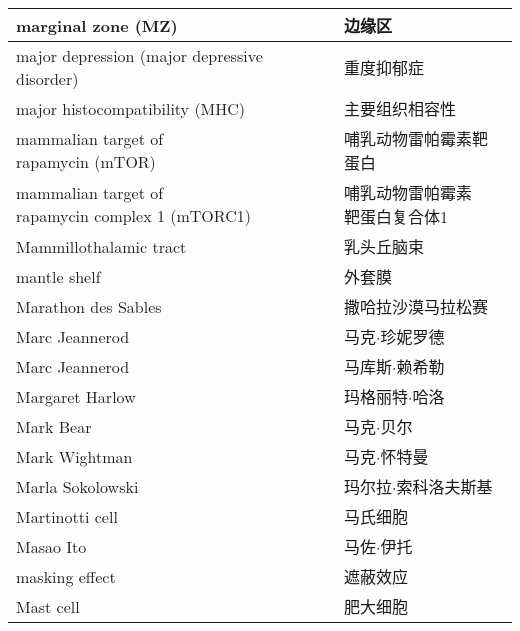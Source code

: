 \begin{longtable}{lll}
	\midrule
	marginal zone (MZ)   && 边缘区  \\
	
	\midrule
	major depression (major depressive disorder)   && 重度抑郁症  \\
	
	\midrule
	major histocompatibility (MHC)   && 主要组织相容性  \\
	
	\midrule
	\makecell[l]{mammalian target of \\rapamycin (mTOR)}   && 哺乳动物雷帕霉素靶蛋白  \\
	
	\midrule
	\makecell[l]{mammalian target of \\rapamycin complex 1 (mTORC1)}   && \makecell[l]{哺乳动物雷帕霉素\\靶蛋白复合体1}  \\
	
	\midrule
	Mammillothalamic tract   && 乳头丘脑束  \\
	
	\midrule
	mantle shelf   && 外套膜  \\
	
	\midrule
	Marathon des Sables   && 撒哈拉沙漠马拉松赛  \\
	
	\midrule
	Marc Jeannerod   && 马克$\cdot$珍妮罗德  \\
	
	\midrule
	Marc Jeannerod   && 马库斯$\cdot$赖希勒  \\
	
	\midrule
	Margaret Harlow   && 玛格丽特$\cdot$哈洛  \\
	
	\midrule
	Mark Bear   && 马克$\cdot$贝尔  \\
	
	\midrule
	Mark Wightman   && 马克$\cdot$怀特曼  \\
	
	\midrule
	Marla Sokolowski   && 玛尔拉$\cdot$索科洛夫斯基 \\
	
	\midrule
	Martinotti cell   && 马氏细胞 \\
	
	\midrule
	Masao Ito   && 马佐$\cdot$伊托 \\
	
	\midrule
	masking effect   && 遮蔽效应 \\
	
	\midrule
	Mast cell   && 肥大细胞 \\
	

\end{longtable}
